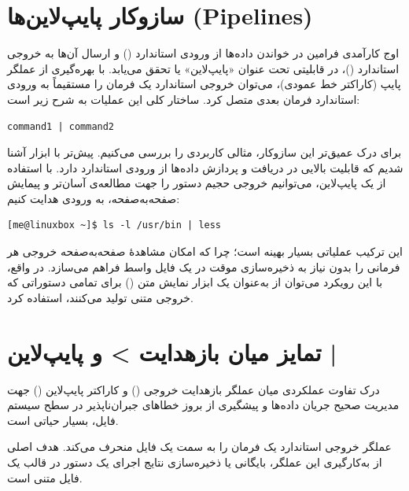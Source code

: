 \section{سازوکار پایپ‌لاین‌ها (Pipelines)}

اوج کارآمدی فرامین در خواندن داده‌ها از ورودی استاندارد () و ارسال آن‌ها به خروجی استاندارد ()، در قابلیتی تحت عنوان «پایپ‌لاین» یا  تحقق می‌یابد. با بهره‌گیری از عملگر پایپ \cmd{|} (کاراکتر خط عمودی)، می‌توان خروجی استاندارد یک فرمان را مستقیماً به ورودی استاندارد فرمان بعدی متصل کرد. ساختار کلی این عملیات به شرح زیر است:

\begin{latin}
\begin{lstlisting}
command1 | command2
\end{lstlisting}
\end{latin}

برای درک عمیق‌تر این سازوکار، مثالی کاربردی را بررسی می‌کنیم. پیش‌تر با ابزار  آشنا شدیم که قابلیت بالایی در دریافت و پردازش داده‌ها از ورودی استاندارد دارد. با استفاده از یک پایپ‌لاین، می‌توانیم خروجی حجیم دستور  را جهت مطالعه‌ی آسان‌تر و پیمایش صفحه‌به‌صفحه، به ورودی  هدایت کنیم:

\begin{latin}
\begin{lstlisting}
[me@linuxbox ~]$ ls -l /usr/bin | less
\end{lstlisting}
\end{latin}

این ترکیب عملیاتی بسیار بهینه است؛ چرا که امکان مشاهدهٔ صفحه‌به‌صفحه خروجی هر فرمانی را بدون نیاز به ذخیره‌سازی موقت در یک فایل واسط فراهم می‌سازد. در واقع، با این رویکرد می‌توان از  به‌عنوان یک ابزار نمایش متن () برای تمامی دستوراتی که خروجی متنی تولید می‌کنند، استفاده کرد.

\section{تمایز میان بازهدایت > و پایپ‌لاین |}

درک تفاوت عملکردی میان عملگر بازهدایت خروجی (\cmd{>}) و کاراکتر پایپ‌لاین (\cmd{|}) جهت مدیریت صحیح جریان داده‌ها و پیشگیری از بروز خطاهای جبران‌ناپذیر در سطح سیستم فایل، بسیار حیاتی است.

عملگر \cmd{>} خروجی استاندارد یک فرمان را به سمت یک فایل منحرف می‌کند. هدف اصلی از به‌کارگیری این عملگر، بایگانی یا ذخیره‌سازی نتایج اجرای یک دستور در قالب یک فایل متنی است.

